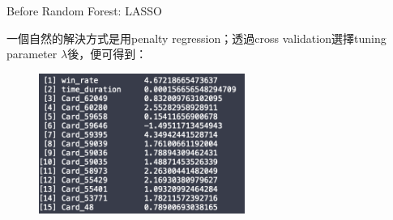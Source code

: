 \documentclass[12pt]{beamer}
\begin{document}
\begin{frame}[fragile]{Before Random Forest: LASSO}

一個自然的解決方式是用penalty regression；透過cross validation選擇tuning parameter $\lambda$後，便可得到：


	\begin{figure}
		\begin{center}
			\includegraphics[width=0.6\textwidth]{figure/f09.png}
		\end{center}
	\end{figure}

\end{frame}
\end{document}
